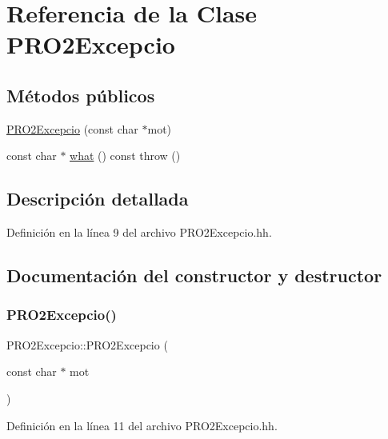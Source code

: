 \hypertarget{class_p_r_o2_excepcio}{}\section{Referencia de la Clase P\+R\+O2\+Excepcio}
\label{class_p_r_o2_excepcio}
\subsection*{Métodos públicos}
\begin{DoxyCompactItemize}
\item 
\hyperlink{class_p_r_o2_excepcio_ac86c0800bbe57a3376f18a3ad6ea3c02}{P\+R\+O2\+Excepcio} (const char $\ast$mot)
\item 
const char $\ast$ \hyperlink{class_p_r_o2_excepcio_a24de68a95e8e7d4fccc147e94411d70c}{what} () const  throw ()
\end{DoxyCompactItemize}


\subsection{Descripción detallada}


Definición en la línea 9 del archivo P\+R\+O2\+Excepcio.\+hh.



\subsection{Documentación del constructor y destructor}
\mbox{\label{class_p_r_o2_excepcio_ac86c0800bbe57a3376f18a3ad6ea3c02}} 
\subsubsection{\texorpdfstring{P\+R\+O2\+Excepcio()}{PRO2Excepcio()}}
{\footnotesize\ttfamily P\+R\+O2\+Excepcio\+::\+P\+R\+O2\+Excepcio (\begin{DoxyParamCaption}\item[{const char $\ast$}]{mot }\end{DoxyParamCaption})}



Definición en la línea 11 del archivo P\+R\+O2\+Excepcio.\+hh.


